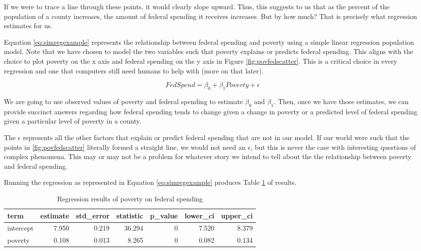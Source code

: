 \documentclass[
]{book}
\begin{document}
If we were to trace a line through these points, it would clearly slope upward. Thus, this suggests to us that as the percent of the population of a county increases, the amount of federal spending it receives increases. But by how much? That is precisely what regression estimates for us.

Equation \eqref{eq:simregexample} represents the relationship between federal spending and poverty using a simple linear regression population model. Note that we have chosen to model the two variables such that poverty explains or predicts federal spending. This aligns with the choice to plot poverty on the x axis and federal spending on the y axis in Figure \ref{fig:povfedscatter}. This is a critical choice in every regression and one that computers still need humans to help with (more on that later).

\begin{equation}
FedSpend = \beta_0+\beta_1Poverty + \epsilon
\label{eq:simregexample}
\end{equation}

We are going to use observed values of poverty and federal spending to estimate \(\beta_0\) and \(\beta_1\). Then, once we have those estimates, we can provide succinct answers regarding how federal spending tends to change given a change in poverty or a predicted level of federal spending given a particular level of poverty in a county.

The \(\epsilon\) represents all the other factors that explain or predict federal spending that are not in our model. If our world were such that the points in \ref{fig:povfedscatter} literally formed a straight line, we would not need an \(\epsilon\), but this is never the case with interesting questions of complex phenomena. This may or may not be a problem for whatever story we intend to tell about the the relationship between poverty and federal spending.

Running the regression as represented in Equation \eqref{eq:simregexample} produces Table \ref{tab:simpregextab} of results.

\begin{table}

\caption{\label{tab:simpregextab}Regression results of poverty on federal spending}
\centering
\begin{tabular}[t]{l|r|r|r|r|r|r}
\hline
term & estimate & std\_error & statistic & p\_value & lower\_ci & upper\_ci\\
\hline
intercept & 7.950 & 0.219 & 36.294 & 0 & 7.520 & 8.379\\
\hline
poverty & 0.108 & 0.013 & 8.265 & 0 & 0.082 & 0.134\\
\hline
\end{tabular}
\end{table}
\end{document}
